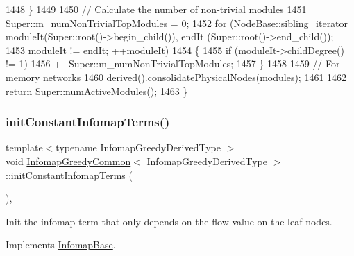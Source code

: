 \begin{DoxyCode}
1448     \}
1449 
1450     \textcolor{comment}{// Calculate the number of non-trivial modules}
1451     Super::m\_numNonTrivialTopModules = 0;
1452     \textcolor{keywordflow}{for} (\mbox{\hyperlink{classSiblingIterator}{NodeBase::sibling\_iterator}} moduleIt(Super::root()->begin\_child()), endIt
      (Super::root()->end\_child());
1453             moduleIt != endIt; ++moduleIt)
1454     \{
1455         \textcolor{keywordflow}{if} (moduleIt->childDegree() != 1)
1456             ++Super::m\_numNonTrivialTopModules;
1457     \}
1458 
1459     \textcolor{comment}{// For memory networks}
1460     derived().consolidatePhysicalNodes(modules);
1461 
1462     \textcolor{keywordflow}{return} Super::numActiveModules();
1463 \}
\end{DoxyCode}
\mbox{\label{classInfomapGreedyCommon_af6135849730a24a4f3fea57ff32991e5}} 
\subsubsection{\texorpdfstring{init\+Constant\+Infomap\+Terms()}{initConstantInfomapTerms()}}
{\footnotesize\ttfamily template$<$typename Infomap\+Greedy\+Derived\+Type $>$ \\
void \mbox{\hyperlink{classInfomapGreedyCommon}{Infomap\+Greedy\+Common}}$<$ Infomap\+Greedy\+Derived\+Type $>$\+::init\+Constant\+Infomap\+Terms (\begin{DoxyParamCaption}{ }\end{DoxyParamCaption})\hspace{0.3cm}{\ttfamily [protected]}, {\ttfamily [virtual]}}

Init the infomap term that only depends on the flow value on the leaf nodes. 

Implements \mbox{\hyperlink{classInfomapBase_a093ad5e840cb4529ac32eaf4f9d6d8b2}{Infomap\+Base}}.


